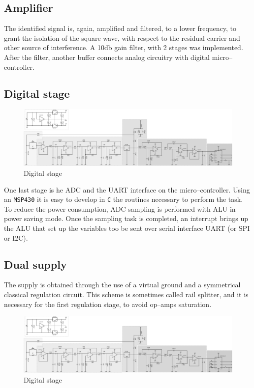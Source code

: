 \subsection{Amplifier}
The identified signal is, again, amplified and filtered, to a lower frequency, to grant the isolation of the square wave, with respect to the residual carrier and other source of interference. A \num{10}\si{\decibel} gain filter, with 2 stages was implemented. After the filter, another buffer connects analog circuitry with digital micro--controller.

\subsection{Digital stage}
\begin{figure}
	\centering
	\includegraphics*[viewport=2320 3 2650 350,scale=0.4]{ch2/img/receiver3.pdf}
	\caption{Digital stage}
	\label{fig:adc}
\end{figure}
One last stage is he ADC and the UART interface on the micro--controller. Using an \texttt{MSP430} it is easy to develop in \texttt{C} the routines necessary to perform the task. To reduce the power consumption, ADC sampling is performed with ALU in power saving mode. Once the sampling task is completed, an interrupt brings up the ALU that set up the variables too be sent over serial interface UART (or SPI or I2C).

\subsection{Dual supply}
The supply is obtained through the use of a virtual ground and a symmetrical classical regulation circuit. This scheme is sometimes called rail splitter, and it is necessary for the first regulation stage, to avoid op--amps saturation.
\begin{figure}
	\centering
	\includegraphics*[viewport=3 450 580 750,scale=0.4]{ch2/img/receiver3.pdf}
	\caption{Digital stage}
	\label{fig:adc}
\end{figure}

